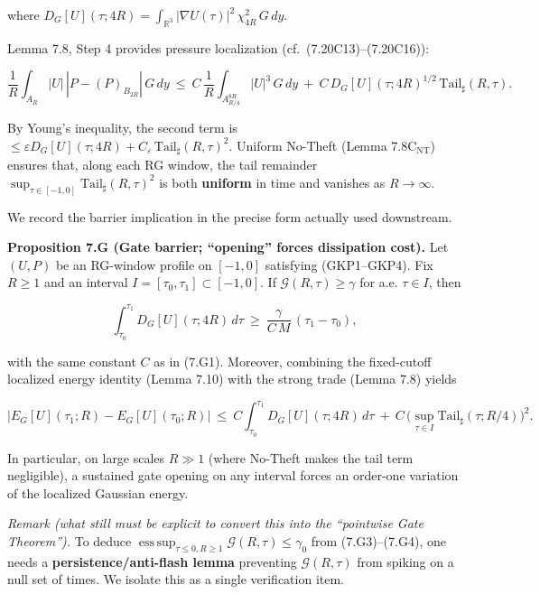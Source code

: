 \documentclass[
  11pt,
]{article}
\begin{document}
where \(D_G[U](\tau;4R)=\int_{\mathbb R^3}|\nabla U(\tau)|^2\,\chi_{4R}^2\,G\,dy\).

Lemma 7.8, Step 4 provides pressure localization (cf.~(7.20C13)--(7.20C16)):

\begin{equation}
\frac1R\int_{A_R}|U|\,|P-(P)_{B_{2R}}|\,G\,dy
\ \le\ C\,\frac1R\int_{A_{R/4}^{8R}}|U|^3\,G\,dy
\ +\ C\,D_G[U](\tau;4R)^{1/2}\,\mathrm{Tail}_\sharp(R,\tau).
\tag{7.G2}
\end{equation}

By Young's inequality, the second term is \(\le \varepsilon D_G[U](\tau;4R)+C_\varepsilon\,\mathrm{Tail}_\sharp(R,\tau)^2\). Uniform No-Theft (Lemma 7.8C\(_{\mathrm{NT}}\)) ensures that, along each RG window, the tail remainder \(\sup_{\tau\in[-1,0]}\mathrm{Tail}_\sharp(R,\tau)^2\) is both \textbf{uniform} in time and vanishes as \(R\to\infty\).

We record the barrier implication in the precise form actually used downstream.

\textbf{Proposition 7.G (Gate barrier; ``opening'' forces dissipation cost).} Let \((U,P)\) be an RG-window profile on \([-1,0]\) satisfying (GKP1--GKP4). Fix \(R\ge 1\) and an interval \(I=[\tau_0,\tau_1]\subset[-1,0]\). If \(\mathcal G(R,\tau)\ge \gamma\) for a.e. \(\tau\in I\), then

\begin{equation}
\int_{\tau_0}^{\tau_1} D_G[U](\tau;4R)\,d\tau\ \ge\ \frac{\gamma}{C\,M}\,(\tau_1-\tau_0),
\tag{7.G3}
\end{equation}

with the same constant \(C\) as in (7.G1). Moreover, combining the fixed-cutoff localized energy identity (Lemma 7.10) with the strong trade (Lemma 7.8) yields

\begin{equation}
\big|E_G[U](\tau_1;R)-E_G[U](\tau_0;R)\big|
\ \le\ C\int_{\tau_0}^{\tau_1} D_G[U](\tau;4R)\,d\tau
\ +\ C\,\Big(\sup_{\tau\in I}\mathrm{Tail}_\sharp(\tau;R/4)\Big)^2.
\tag{7.G4}
\end{equation}

In particular, on large scales \(R\gg1\) (where No-Theft makes the tail term negligible), a sustained gate opening on any interval forces an order-one variation of the localized Gaussian energy.

\emph{Remark (what still must be explicit to convert this into the ``pointwise Gate Theorem'').} To deduce \(\operatorname*{ess\,sup}_{\tau\le0,R\ge1}\mathcal G(R,\tau)\le\gamma_0\) from (7.G3)--(7.G4), one needs a \textbf{persistence/anti-flash lemma} preventing \(\mathcal G(R,\tau)\) from spiking on a null set of times. We isolate this as a single verification item.
\end{document}
